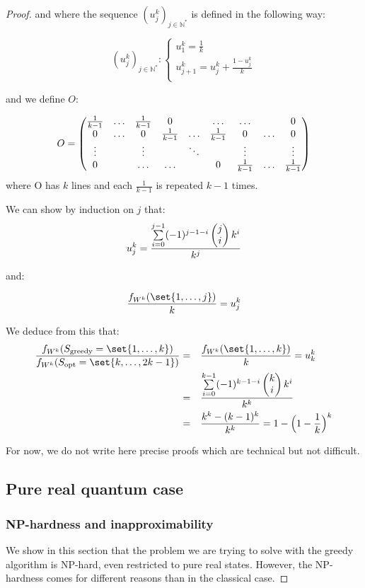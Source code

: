 \documentclass{article}
\theoremstyle{definition}
\theoremstyle{remark}
\begin{document}
\begin{proof}
     and where the sequence $(u^k_j)_{j \in \mathbb{N^*}}$ is defined in the following way:

     \[(u^k_j)_{j \in \mathbb{N^*}} : \begin{cases}
      u^k_1 = \frac{1}{k}\\
      u^k_{j+1} = u^k_j + \frac{1-u^k_j}{k}\\
      \end{cases}
      \]

      and we define $O$:
      
     \[O = \pmqty{\frac{1}{k-1} & \ldots &\frac{1}{k-1} & 0 && \ldots & \ldots && 0\\
       0 & \ldots & 0 & \frac{1}{k-1} & \ldots &\frac{1}{k-1} &  0 & \ldots & 0\\
       \vdots  && \vdots && \ddots && \vdots && \vdots\\
       0 && \ldots & \ldots && 0 &\frac{1}{k-1} & \ldots &\frac{1}{k-1}\\
     }\]
     where O has $k$ lines and each $\frac{1}{k-1}$ is repeated $k-1$ times.

     We can show by induction on $j$ that:
     \[u^k_j = \frac{\overset{j-1}{\underset{i=0}{\sum}}(-1)^{j-1-i}\pmqty{j\\i}k^i}{k^j}\]

     and:

     \[\frac{f_{W^k}(\set{1,\ldots,j})}{k} =  u^k_j\]
     
     We deduce from this that:
     \begin{equation}
       \begin{aligned}
         \frac{f_{W^k}(S_{\text{greedy}}=\set{1,\ldots,k})}{f_{W^k}(S_{\text{opt}}=\set{k,\ldots,2k-1})} &=&& \frac{f_{W^k}(\set{1,\ldots,k})}{k} =  u^k_k\\ &=&& \frac{\overset{k-1}{\underset{i=0}{\sum}}(-1)^{k-1-i}\pmqty{k\\i}k^i}{k^k}\\
         &=&& \frac{k^k-(k-1)^k}{k^k} = 1-\Big(1-\frac{1}{k}\Big)^k
       \end{aligned}
     \end{equation}
     
     For now, we do not write here precise proofs which are technical but not difficult.

     \subsection{Pure real quantum case}
     \subsubsection{NP-hardness and inapproximability}
     We show in this section that the problem we are trying to solve with the greedy algorithm is NP-hard, even restricted to pure real states. However, the NP-hardness comes for different reasons than in the classical case.


\end{proof}
\end{document}
